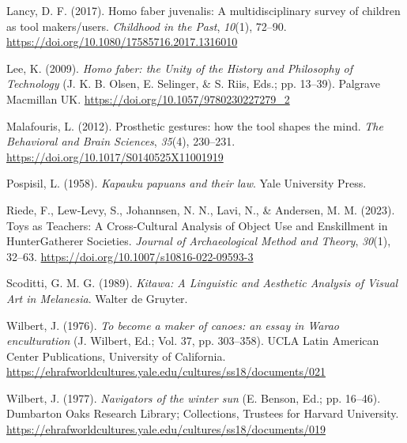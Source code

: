 \documentclass[
  11pt,
]{article}
\newlength{\cslhangindent}
\newenvironment{CSLReferences}[2] %
 {\begin{list}{}{%
  \setlength{\itemindent}{0pt}
  \setlength{\leftmargin}{0pt}
  \setlength{\parsep}{0pt}
  \ifodd #1
   \setlength{\leftmargin}{\cslhangindent}
   \setlength{\itemindent}{-1\cslhangindent}
  \fi
  \setlength{\itemsep}{#2\baselineskip}}}
 {\end{list}}
\begin{document}
\begin{CSLReferences}{1}{0}
Lancy, D. F. (2017). Homo faber juvenalis: A multidisciplinary survey of children as tool makers/users. \emph{Childhood in the Past}, \emph{10}(1), 72--90. \url{https://doi.org/10.1080/17585716.2017.1316010}

Lee, K. (2009). \emph{Homo faber: the Unity of the History and Philosophy of Technology} (J. K. B. Olsen, E. Selinger, \& S. Riis, Eds.; pp. 13--39). Palgrave Macmillan UK. \url{https://doi.org/10.1057/9780230227279_2}

Malafouris, L. (2012). Prosthetic gestures: how the tool shapes the mind. \emph{The Behavioral and Brain Sciences}, \emph{35}(4), 230--231. \url{https://doi.org/10.1017/S0140525X11001919}

Pospisil, L. (1958). \emph{Kapauku papuans and their law}. Yale University Press.

Riede, F., Lew-Levy, S., Johannsen, N. N., Lavi, N., \& Andersen, M. M. (2023). Toys as Teachers: A Cross-Cultural Analysis of Object Use and Enskillment in Hunter{\textendash}Gatherer Societies. \emph{Journal of Archaeological Method and Theory}, \emph{30}(1), 32--63. \url{https://doi.org/10.1007/s10816-022-09593-3}

Scoditti, G. M. G. (1989). \emph{Kitawa: A Linguistic and Aesthetic Analysis of Visual Art in Melanesia}. Walter de Gruyter.

Wilbert, J. (1976). \emph{To become a maker of canoes: an essay in Warao enculturation} (J. Wilbert, Ed.; Vol. 37, pp. 303--358). UCLA Latin American Center Publications, University of California. \url{https://ehrafworldcultures.yale.edu/cultures/ss18/documents/021}

Wilbert, J. (1977). \emph{Navigators of the winter sun} (E. Benson, Ed.; pp. 16--46). Dumbarton Oaks Research Library; Collections, Trustees for Harvard University. \url{https://ehrafworldcultures.yale.edu/cultures/ss18/documents/019}

\end{CSLReferences}
\end{document}
